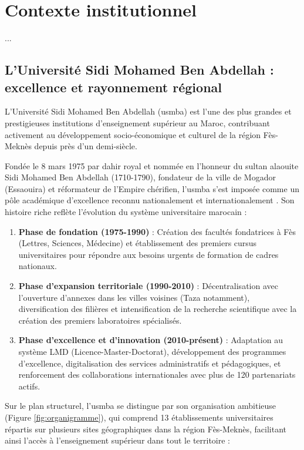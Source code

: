 \documentclass[french,12pt]{report} %
\begin{document}
\section{Contexte institutionnel}

{{ ... }}
\subsection{L'Université Sidi Mohamed Ben Abdellah : excellence et rayonnement régional}

\begin{mdframed}[style=figstyle, backgroundcolor=blue!5]
L'Université Sidi Mohamed Ben Abdellah (\gls{usmba}) est l'une des plus grandes et prestigieuses institutions d'enseignement supérieur au Maroc, contribuant activement au développement socio-économique et culturel de la région Fès-Meknès depuis près d'un demi-siècle.
\end{mdframed}

Fondée le 8 mars 1975 par dahir royal et nommée en l'honneur du sultan alaouite Sidi Mohamed Ben Abdellah (1710-1790), fondateur de la ville de Mogador (Essaouira) et réformateur de l'Empire chérifien, l'\gls{usmba} s'est imposée comme un pôle académique d'excellence reconnu nationalement et internationalement \cite{MESRSFC2024}. Son histoire riche reflète l'évolution du système universitaire marocain :

\begin{enumerate}
    \item \textbf{Phase de fondation (1975-1990)} : Création des facultés fondatrices à Fès (Lettres, Sciences, Médecine) et établissement des premiers cursus universitaires pour répondre aux besoins urgents de formation de cadres nationaux.
    \item \textbf{Phase d'expansion territoriale (1990-2010)} : Décentralisation avec l'ouverture d'annexes dans les villes voisines (Taza notamment), diversification des filières et intensification de la recherche scientifique avec la création des premiers laboratoires spécialisés.
    \item \textbf{Phase d'excellence et d'innovation (2010-présent)} : Adaptation au système LMD (Licence-Master-Doctorat), développement des programmes d'excellence, digitalisation des services administratifs et pédagogiques, et renforcement des collaborations internationales avec plus de 120 partenariats actifs.
\end{enumerate}

Sur le plan structurel, l'\gls{usmba} se distingue par son organisation ambitieuse (Figure \ref{fig:organigramme}), qui comprend 13 établissements universitaires répartis sur plusieurs sites géographiques dans la région Fès-Meknès, facilitant ainsi l'accès à l'enseignement supérieur dans tout le territoire :
\end{document}
